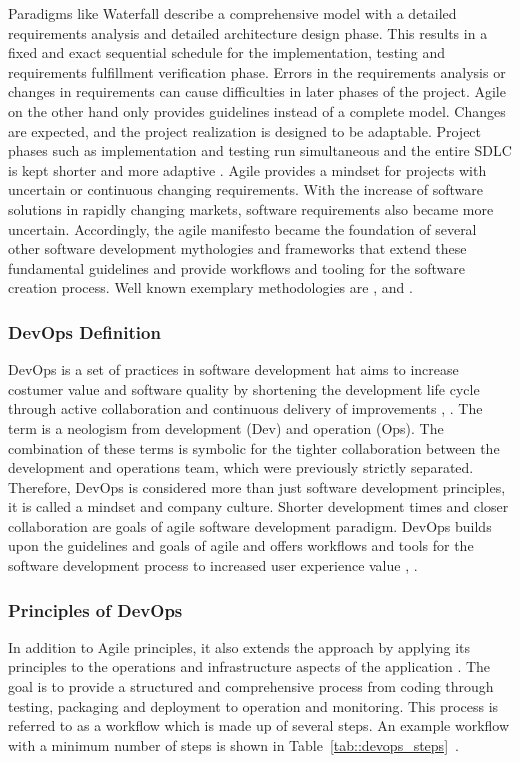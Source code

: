 \documentclass[12pt, a4paper]{article}
\begin{document}
        \noindent Paradigms like Waterfall describe a comprehensive model with a detailed requirements analysis and detailed architecture design phase. This results in a fixed and exact sequential schedule for the implementation, testing and requirements fulfillment verification phase. Errors in the requirements analysis or changes in requirements can cause difficulties in later phases of the project. Agile on the other hand only provides guidelines instead of a complete model. Changes are expected, and the project realization is designed to be adaptable. Project phases such as implementation and testing run simultaneous and the entire \ac{SDLC} is kept shorter and more adaptive \cite{agile_practice}.\newline
        Agile provides a mindset for projects with uncertain or continuous changing requirements. With the increase of software solutions in rapidly changing markets, software requirements also became more uncertain. Accordingly, the agile manifesto became the foundation of several other software development mythologies and frameworks that extend these fundamental guidelines and provide workflows and tooling for the software creation process. Well known exemplary methodologies are ,  and .

        \subsubsection{DevOps Definition}
        DevOps is a set of practices in software development hat aims to increase costumer value and software quality by shortening the development life cycle through active collaboration and continuous delivery of improvements \cite{base_devops}, \cite{effective_devops}. The term  is a neologism from development (Dev) and operation (Ops). The combination of these terms is symbolic for the tighter collaboration between the development and operations team, which were previously strictly separated. Therefore, DevOps is considered more than just software development principles, it is called a mindset and company culture. Shorter development times and closer collaboration are goals of agile software development paradigm. DevOps builds upon the guidelines and goals of agile and offers workflows and tools for the software development process to increased user experience value \cite{azuredevops}, \cite{effective_devops}.

        \subsubsection{Principles of DevOps}\label{ssec::devops_princibles}
        In addition to Agile principles, it also extends the  approach by applying its principles to the operations and infrastructure aspects of the application \cite{effective_devops}. The goal is to provide a structured and comprehensive process from coding through testing, packaging and deployment to operation and monitoring. This process is referred to as a workflow which is made up of several steps. An example workflow with a minimum number of steps is shown in Table~\ref{tab::devops_steps}~\cite{base_devops}.
\end{document}
